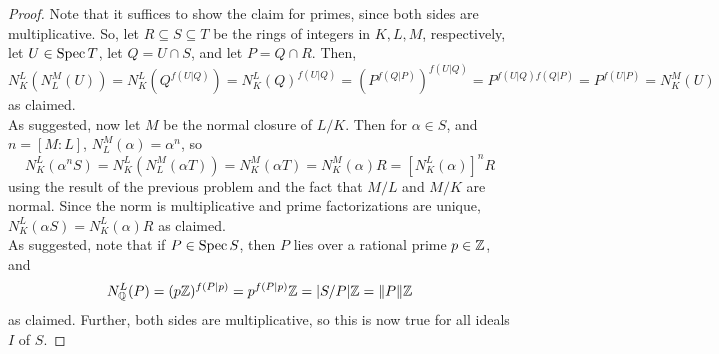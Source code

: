 \begin{proof}
	Note that it suffices to show the claim for primes, since both sides are multiplicative. So, let $R \subseteq S \subseteq T$ be the rings of integers in $K,L,M$, respectively, let $U \in \operatorname{Spec} T$, let $Q = U \cap S$, and let $P = Q \cap R$. Then,
	\[ N_K^L(N_L^M(U)) = N_K^L(Q^{f(U|Q)}) = N_K^L(Q)^{f(U|Q)} = (P^{f(Q|P)})^{f(U|Q)} = P^{f(U|Q)f(Q|P)} = P^{f(U|P)} = N_K^M(U) \]
	as claimed. \\
	
	As suggested, now let $M$ be the normal closure of $L/K$. Then for $\alpha \in S$, and $n = [M:L]$, $N_L^M(\alpha) = \alpha^n$, so
	\[ N_K^L(\alpha^nS) = N_K^L(N_L^M(\alpha T)) = N_K^M(\alpha T) = N_K^M(\alpha)R = [N_K^L(\alpha)]^nR \]
	using the result of the previous problem and the fact that $M/L$ and $M/K$ are normal. Since the norm is multiplicative and prime factorizations are unique, $N_K^L(\alpha S) = N_K^L(\alpha)R$ as claimed. \\
	
	As suggested, note that if $P \in \operatorname{Spec} S$, then $P$ lies over a rational prime $p \in \mathbb{Z}$, and
	\[ N_{\mathbb{Q}}^L(P) = (p\mathbb{Z})^{f(P|p)} = p^{f(P|p)}\mathbb{Z} = |S/P|\mathbb{Z} = \|P\|\mathbb{Z} \]
	as claimed. Further, both sides are multiplicative, so this is now true for all ideals $I$ of $S$.
\end{proof}
